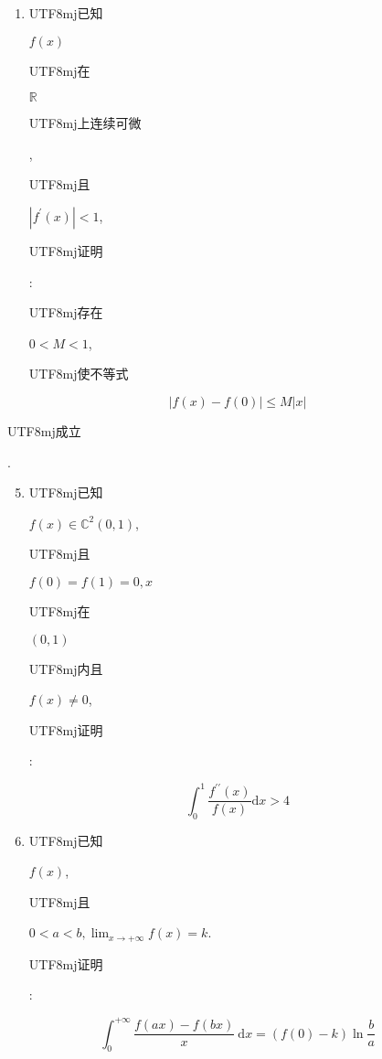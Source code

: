 \documentclass[10pt]{article}
\begin{document}
\begin{enumerate}
  \item \begin{CJK}{UTF8}{mj}已知\end{CJK} $f(x)$ \begin{CJK}{UTF8}{mj}在\end{CJK} $\mathbb{R}$ \begin{CJK}{UTF8}{mj}上连续可微\end{CJK}, \begin{CJK}{UTF8}{mj}且\end{CJK} $\left|f^{\prime}(x)\right|<1$, \begin{CJK}{UTF8}{mj}证明\end{CJK}: \begin{CJK}{UTF8}{mj}存在\end{CJK} $0<M<1$, \begin{CJK}{UTF8}{mj}使不等式\end{CJK}

\end{enumerate}
$$
|f(x)-f(0)| \leq M|x|
$$
\begin{CJK}{UTF8}{mj}成立\end{CJK}.

\begin{enumerate}
  \setcounter{enumi}{4}
  \item \begin{CJK}{UTF8}{mj}已知\end{CJK} $f(x) \in \mathbb{C}^{2}(0,1)$, \begin{CJK}{UTF8}{mj}且\end{CJK} $f(0)=f(1)=0, x$ \begin{CJK}{UTF8}{mj}在\end{CJK} $(0,1)$ \begin{CJK}{UTF8}{mj}内且\end{CJK} $f(x) \neq 0$, \begin{CJK}{UTF8}{mj}证明\end{CJK}:
\end{enumerate}
$$
\int_{0}^{1} \frac{f^{\prime \prime}(x)}{f(x)} \mathrm{d} x>4
$$

\begin{enumerate}
  \setcounter{enumi}{5}
  \item \begin{CJK}{UTF8}{mj}已知\end{CJK} $f(x)$, \begin{CJK}{UTF8}{mj}且\end{CJK} $0<a<b, \lim _{x \rightarrow+\infty} f(x)=k$. \begin{CJK}{UTF8}{mj}证明\end{CJK}:
\end{enumerate}
$$
\int_{0}^{+\infty} \frac{f(a x)-f(b x)}{x} \mathrm{~d} x=(f(0)-k) \ln \frac{b}{a}
$$
\end{document}
